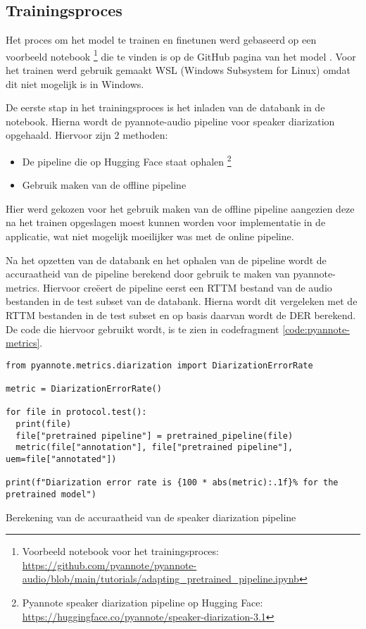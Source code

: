 \subsection{Trainingsproces}
\label{subsec:proces}
Het proces om het model te trainen en finetunen werd gebaseerd op een voorbeeld notebook \footnote{Voorbeeld notebook voor het trainingsproces: \url{https://github.com/pyannote/pyannote-audio/blob/main/tutorials/adapting_pretrained_pipeline.ipynb}} die te vinden is op de GitHub pagina van het model \autocite{Bredin2024}. Voor het trainen werd gebruik gemaakt WSL (Windows Subsystem for Linux) omdat dit niet mogelijk is in Windows.

De eerste stap in het trainingsproces is het inladen van de databank in de notebook. Hierna wordt de pyannote-audio pipeline voor speaker diarization opgehaald. Hiervoor zijn 2 methoden:
\begin{itemize}
	\item De pipeline die op Hugging Face staat ophalen \footnote{Pyannote speaker diarization pipeline op Hugging Face: \url{https://huggingface.co/pyannote/speaker-diarization-3.1}}
	\item Gebruik maken van de offline pipeline
\end{itemize}
Hier werd gekozen voor het gebruik maken van de offline pipeline aangezien deze na het trainen opgeslagen moest kunnen worden voor implementatie in de applicatie, wat niet mogelijk moeilijker was met de online pipeline.

Na het opzetten van de databank en het ophalen van de pipeline wordt de accuraatheid van de pipeline berekend door gebruik te maken van pyannote-metrics. Hiervoor creëert de pipeline eerst een RTTM bestand van de audio bestanden in de test subset van de databank. Hierna wordt dit vergeleken met de RTTM bestanden in de test subset en op basis daarvan wordt de DER berekend. De code die hiervoor gebruikt wordt, is te zien in codefragment \ref{code:pyannote-metrics}.

\begin{listing}
	\begin{verbatim}
from pyannote.metrics.diarization import DiarizationErrorRate

metric = DiarizationErrorRate()

for file in protocol.test():
  print(file)
  file["pretrained pipeline"] = pretrained_pipeline(file)
  metric(file["annotation"], file["pretrained pipeline"], uem=file["annotated"])

print(f"Diarization error rate is {100 * abs(metric):.1f}% for the pretrained model")
	\end{verbatim}
	\caption[Berekening DER met pyannote-metrics]{\label{code:pyannote-metrics}Berekening van de accuraatheid van de speaker diarization pipeline}
\end{listing}

